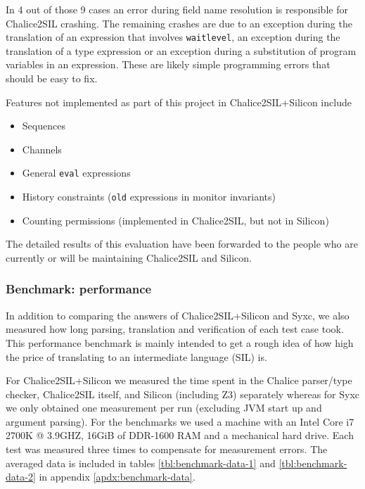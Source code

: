 In 4 out of those 9 cases an error during field name resolution is responsible for Chalice2SIL crashing. 
The remaining crashes are due to an exception during the translation of an expression that involves \lstinline[language=Chalice]!waitlevel!, an exception during the translation of a type expression or an exception during a substitution of program variables in an expression.
These are likely simple programming errors that should be easy to fix.

Features not implemented as part of this project in Chalice2SIL+Silicon include
\begin{itemize}
\item Sequences
\item Channels
\item General \lstinline[language=Chalice]!eval! expressions
\item History constraints (\lstinline[language=Chalice]!old! expressions in monitor invariants)
\item Counting permissions (implemented in Chalice2SIL, but not in Silicon)
\end{itemize}

The detailed results of this evaluation have been forwarded to the people who are currently or will be maintaining Chalice2SIL and Silicon.

\subsubsection{Benchmark: performance}
In addition to comparing the answers of Chalice2SIL+Silicon and Syxc, we also measured how long parsing, translation and verification of each test case took.
This performance benchmark is mainly intended to get a rough idea of how high the price of translating to an intermediate language (SIL) is.

For Chalice2SIL+Silicon we measured the time spent in the Chalice parser/type checker, Chalice2SIL itself, and Silicon (including Z3) separately whereas for Syxc we only obtained one measurement per run (excluding JVM start up and argument parsing).
For the benchmarks we used a machine with an Intel Core i7 2700K @ 3.9GHZ, 16GiB of DDR-1600 RAM and a mechanical hard drive.
Each test was measured three times to compensate for measurement errors.
The averaged data is included in tables \ref{tbl:benchmark-data-1} and \ref{tbl:benchmark-data-2} in appendix \ref{apdx:benchmark-data}.

